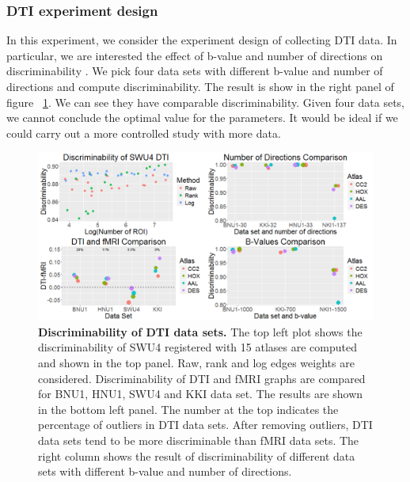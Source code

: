 \documentclass{article}
\begin{document}
\subsubsection{DTI experiment design}
In this experiment, we consider the experiment design of collecting DTI data. In particular, we are interested the effect of b-value and number of directions on discriminability \cite{westin2002processing}. We pick four data sets with different b-value and number of directions and compute discriminability. The result is show in the right panel of figure ~\ref{fig:comb_dti}. We can see they have comparable discriminability. Given four data sets, we cannot conclude the optimal value for the parameters. It would be ideal if we could carry out a more controlled study with more data.

\begin{figure}[H]
	\includegraphics[width=\linewidth]{../Figs/comb_dti.png}
	\caption{{ \bf Discriminability of DTI data sets.} The top left plot shows the discriminability of SWU4 registered with 15 atlases are computed and shown in the top panel. Raw, rank and log edges weights are considered. Discriminability of DTI and fMRI graphs are compared for BNU1, HNU1, SWU4 and KKI data set. The results are shown in the bottom left panel. The number at the top indicates the percentage of outliers in DTI data sets. After removing outliers, DTI data sets tend to be more discriminable than fMRI data sets. The right column shows the result of discriminability of different data sets with different b-value and number of directions.}
	\label{fig:comb_dti}
\end{figure}
\end{document}
